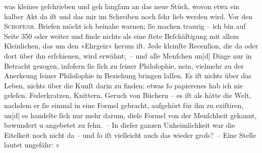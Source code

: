 \begin{ledgroupsized}[t]{13cm}
                  was kleines geſchrieben und
               geh langſam an das neue Stück,
               wovon etwa ein halber Akt da iſt und das mir im Schreiben noch ſehr lieb werden
               wird.\pend
           \pstart
           {\pb}Vor den \textsc{Schopenh}. Briefen möcht ich beinahe warnen; ſie machen
               traurig – ich bin auf Seite 350 oder weiter und finde nichts als eine ſtete
               Beſchäftigung mit allem Kleinlichen, das um den »Ehrgeiz« herum iſt. Jede kleinſte
               Recenſion, die da oder dort über ihn erſchienen, wird erwähnt; – und alle Menſchen
                  un{[}d{]} Dinge nur in Betracht gezogen, inſofern ſie ſich zu
               ſeiner Philoſophie, nein, vielmehr zu der Anerke{\geminationn}ung
               ſeiner Philoſophie in Beziehung bringen laſſen. Es iſt nichts über das Leben, nichts
               über die Kunſt darin zu {\pb}finden; etwas ſo papierenes hab
               ich nie geleſen. Federkratzen, Knittern, Geruch von Büchern – es iſt als hätte die
               Welt, nachdem er ſie einmal in eine Formel gebracht, aufgehört für ihn zu exiſtiren,
                  un{[}d{]} es handelte ſich nur mehr darum, dieſe Formel von der
               Menſchheit gekannt, bewundert u angebetet zu ſehn. – In dieſer ganzen Unheimlichkeit
               war die Eitelkeit noch nicht da – und ſo iſt vielleicht auch das wieder groſs? – Eine
               Stelle lautet ungefähr: »\label{K_L00467_1v}
\end{ledgroupsized}
